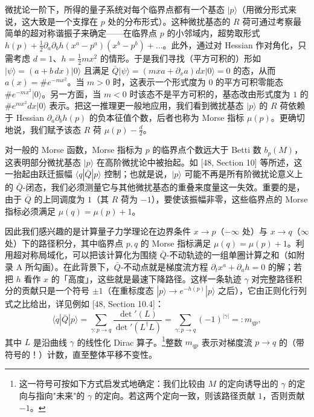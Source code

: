 微扰论一阶下，所得的量子系统对每个临界点都有一个基态 $|p\rangle$（用微分形式来说，这大致是一个支撑在 $p$ 处的分布形式）。这种微扰基态的 $R$ 荷可通过考察最简单的超对称谐振子来确定——在临界点 $p$ 的小邻域内，超势取形式 $h(p)+\frac{1}{2}\partial_a\partial_b h(x^a-p^a)(x^b-p^b)+\dots$。此外，通过对 Hessian 作对角化，只需考虑 $d=1$、$h=\frac{1}{2}mx^2$ 的情形。于是我们寻找（平方可积的）形如 $|\psi\rangle=(a+b\,dx)|0\rangle$ 且满足 $\bar Q|\psi\rangle=(mxa+\partial_x a)dx|0\rangle=0$ 的态，从而 $a(x)=\#e^{-mx^2}$。当 $m>0$ 时，这表示一个形式度为 $0$ 的平方可积零能态 $\#e^{-mx^2}|0\rangle$。另一方面，当 $m<0$ 时该态不是平方可积的，基态改由形式度为 $1$ 的 $\#e^{mx^2}dx|0\rangle$ 表示。把这一推理更一般地应用，我们看到微扰基态 $|p\rangle$ 的 $R$ 荷依赖于 Hessian $\partial_a\partial_b h(p)$ 的负本征值个数，后者也称为 Morse 指标 $\mu(p)$。更确切地说，我们赋予该态 $R$ 荷 $\mu(p)-\frac{d}{2}$。

对一般的 Morse 函数，Morse 指标为 $p$ 的临界点个数远大于 Betti 数 $b_p(M)$，这表明部分微扰基态 $|p\rangle$ 在高阶微扰论中被抬起。如 [48, Section 10] 等所述，这一抬起由跃迁振幅 $\langle q|\bar Q|p\rangle$ 控制；也就是说，$|p\rangle$ 可能不再是所有阶微扰论意义上的 $\bar Q$-闭态，我们必须测量它与其他微扰基态的重叠来度量这一失效。重要的是，由于 $\bar Q$ 的上同调度为 $1$（其 $R$ 荷为 $-1$），要使该振幅非零，这些临界点的 Morse 指标必须满足 $\mu(q)=\mu(p)+1$。

因此我们感兴趣的是计算量子力学理论在边界条件 $x\to p$（$-\infty$ 处）与 $x\to q$（$\infty$ 处）下的路径积分，其中临界点 $p,q$ 的 Morse 指标满足 $\mu(q)=\mu(p)+1$。利用超对称局域化，可以把该计算化为围绕 $\bar Q$-不动轨迹的一组单圈计算之和（如附录 A 所勾画）。在此背景下，$\bar Q$-不动点就是梯度流方程 $\partial_t x^a+\partial_a h=0$ 的解；若把 $h$ 看作 $x$ 的「高度」，这些就是最速下降路径。这样一条轨迹 $\gamma$ 对完整路径积分的贡献只是一个符号 $\pm1$（在重标度态 $|p\rangle\to e^{-h(p)}|p\rangle$ 之后），它由正则化行列式之比给出，详见例如 [48, Section 10.4]：
\begin{equation}
  \tag{B.25}
  \langle q|\bar Q|p\rangle=\sum_{\gamma:p\to q}\frac{\det'(L)}{\det'(L^\dagger L)}=\sum_{\gamma:p\to q}(-1)^{|\gamma|}=:m_{qp},
\end{equation}
其中 $L$ 是沿曲线 $\gamma$ 的线性化 Dirac 算子。\footnote{这一符号可按如下方式启发式地确定：我们比较由 $M$ 的定向诱导出的 $\gamma$ 的定向与指向"未来"的 $\gamma$ 的定向。若这两个定向一致，则该路径贡献 $1$，否则贡献 $-1$。}整数 $m_{qp}$ 表示对梯度流 $p\to q$ 的（带符号的！）计数，直至整体平移不变性。
